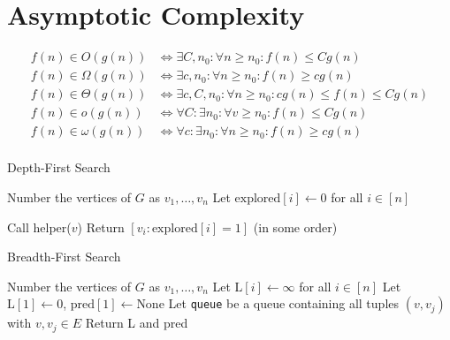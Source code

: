 \documentclass[twocolumn,a4paper,8pt]{extarticle}
\begin{document}
\section{Asymptotic Complexity}

\begin{align*}
f(n) \in O(g(n)) &\iff \exists C, n_0 : \forall n \geq n_0 : f(n)
\leq Cg(n) \\
f(n) \in \Omega(g(n)) &\iff \exists c, n_0 : \forall n \geq n_0 :
f(n) \geq cg(n) \\
f(n) \in \Theta(g(n)) &\iff \exists c, C, n_0 : \forall n \geq n_0 :
cg(n) \leq f(n) \leq Cg(n) \\
f(n) \in o(g(n)) &\iff \forall C : \exists n_0 : \forall v \geq n_0 :
f(n) \leq Cg(n) \\
f(n) \in \omega(g(n)) &\iff \forall c : \exists n_0 : \forall n \geq
n_0 : f(n) \geq cg(n) \\
\end{align*}


\begin{algorithm}
  \caption{Depth-First Search}

  Number the vertices of \(G\) as \(v_1, \dots, v_n\)\;
  Let \(\text{explored}[i] \gets 0\) for all \(i \in [n]\)\;

  Call helper(\(v\))\;
  Return \([v_i : \text{explored}[i] = 1]\) (in some order)\;
\end{algorithm}

\begin{algorithm}
  \caption{Breadth-First Search}

  Number the vertices of \(G\) as \(v_1, \dots, v_n\)\;
  Let \(\text{L}[i] \gets \infty\) for all \(i \in [n]\)\;
  Let \(\text{L}[1] \gets 0\), \(\text{pred}[1] \gets \text{None}\)\;
  Let \texttt{queue} be a queue containing all tuples \((v, v_j)\)
  with \({v, v_j} \in E\)\;
  Return L and pred\;
\end{algorithm}
\end{document}
